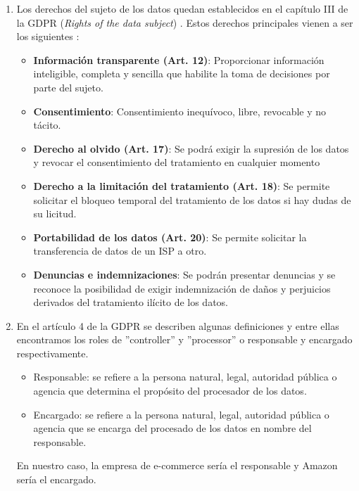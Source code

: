 \documentclass[a4paper,oneside]{article}
\begin{document}
\begin{enumerate}[label=\textbf{\alph*)}]
\item 
Los derechos del sujeto de los datos quedan establecidos en el capítulo III de la GDPR (\textit{Rights of the data subject}) \cite{gdpr}. Estos derechos principales vienen a ser los siguientes \cite{rgpd}:
\begin{itemize}
\item \textbf{Información transparente (Art. 12)}: Proporcionar información inteligible, completa y sencilla que habilite la toma de decisiones por parte del sujeto.
\item \textbf{Consentimiento}: Consentimiento inequívoco, libre, revocable y no tácito.
\item \textbf{Derecho al olvido (Art. 17)}: Se podrá exigir la supresión de los datos y revocar el consentimiento del tratamiento en cualquier momento
\item \textbf{Derecho a la limitación del tratamiento (Art. 18)}: Se permite solicitar el bloqueo temporal del tratamiento de los datos si hay dudas de su licitud.
\item \textbf{Portabilidad de los datos (Art. 20)}: Se permite solicitar la transferencia de datos de un ISP a otro.
\item \textbf{Denuncias e indemnizaciones}: Se podrán presentar denuncias y se reconoce la posibilidad de exigir indemnización de daños y perjuicios derivados del tratamiento ilícito de los datos.
\end{itemize}

\item 
En el artículo 4 de la GDPR se describen algunas definiciones y entre ellas encontramos los roles de ''controller'' y ''processor'' \cite{gdpr} o responsable y encargado respectivamente.
\begin{itemize}
\item Responsable: se refiere a la persona natural, legal, autoridad pública o agencia que determina el propósito del procesador de los datos.
\item Encargado: se refiere a la persona natural, legal, autoridad pública o agencia que se encarga del procesado de los datos en nombre del responsable.
\end{itemize}
En nuestro caso, la empresa de e-commerce sería el responsable y Amazon sería el encargado.
 

\end{enumerate}
\end{document}
